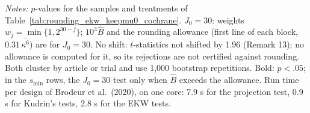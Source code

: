 \begin{table}[htbp]
\medskip
\begin{minipage}{\linewidth}
\footnotesize
\textit{Notes:} $p$-values for the samples and treatments of Table~\ref{tab:rounding_ekw_keepmu0_cochrane}.
$J_0=30$: weights $w_j=\min\{1,2^{30-j}\}$; $10^3\widehat{B}$ and the rounding allowance (first line of each block, $0.31\,\overline{\kappa^6}$) are for $J_0=30$.
No shift: $t$-statistics not shifted by 1.96 (Remark 13); no allowance is computed for it, so its rejections are not certified against rounding.
Both cluster by article or trial and use 1,000 bootstrap repetitions.
Bold: $p<.05$; in the $s_{\min}$ rows, the $J_0=30$ test only when $\widehat{B}$ exceeds the allowance.
Run time per design of Brodeur et al.\ (2020), on one core: 7.9 s for the projection test, 0.9 s for Kudrin's tests, 2.8 s for the EKW tests.
\end{minipage}
\end{table}
